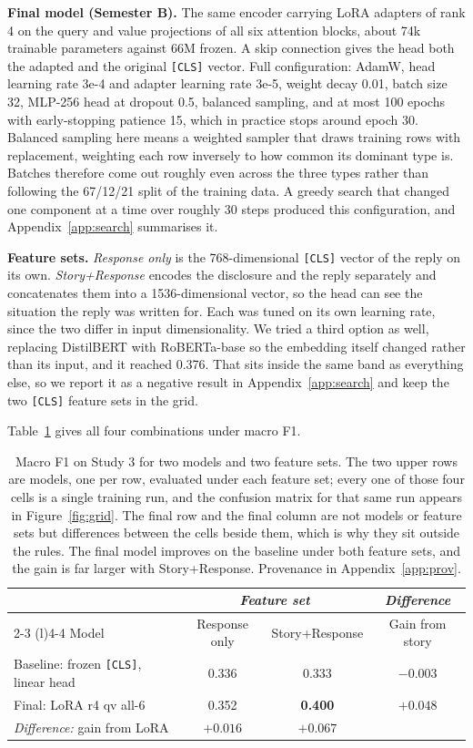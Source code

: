 \documentclass[11pt,a4paper]{article}
\begin{document}
\textbf{Final model (Semester B).} The same encoder carrying LoRA adapters of rank 4 on the
query and value projections of all six attention blocks, about 74k trainable parameters
against 66M frozen. A skip connection gives the head both the adapted and the original
\texttt{[CLS]} vector. Full configuration: AdamW, head learning rate 3e-4 and adapter
learning rate 3e-5, weight decay 0.01, batch size 32, MLP-256 head at dropout 0.5, balanced
sampling, and at most 100 epochs with early-stopping patience 15, which in practice stops
around epoch 30. Balanced sampling here means a weighted sampler that draws training rows
with replacement, weighting each row inversely to how common its dominant type is. Batches
therefore come out roughly even across the three types rather than following the 67/12/21
split of the training data. A greedy search that changed one component at a time over roughly 30
steps produced this configuration, and Appendix~\ref{app:search} summarises it.

\textbf{Feature sets.} \emph{Response only} is the 768-di\-men\-sion\-al \texttt{[CLS]}
vector of the reply on its own. \emph{Story+Response} encodes the disclosure and the reply
separately and concatenates them into a 1536-dimensional vector, so the head can see the
situation the reply was written for. Each was tuned on its own learning rate, since the two
differ in input dimensionality. We tried a third option as well, replacing DistilBERT with
RoBERTa-base so the embedding itself changed rather than its input, and it reached
0.376. That sits inside the same band as everything else, so we
report it as a negative result in Appendix~\ref{app:search} and keep the two
\texttt{[CLS]} feature sets in the grid.

Table~\ref{tab:grid} gives all four combinations under macro F1.

\begin{table}[h]
\centering
\footnotesize
\caption{Macro F1 on Study 3 for two models and two feature sets. The two upper rows are
models, one per row, evaluated under each feature set; every one of those four cells is a
single training run, and the confusion matrix for that same run appears in
Figure~\ref{fig:grid}. The final row and the final column are not models or feature sets but
differences between the cells beside them, which is why they sit outside the rules. The
final model improves on the baseline under both feature sets, and the gain is far larger
with Story+Response. Provenance in Appendix~\ref{app:prov}.}
\label{tab:grid}
\begin{tabular}{@{}lcc@{\qquad}c@{}}
\toprule
& \multicolumn{2}{c}{\textit{Feature set}} & \textit{Difference} \\
\cmidrule(lr){2-3} \cmidrule(l){4-4}
Model & Response only & Story+Response & Gain from story \\
\midrule
Baseline: frozen \texttt{[CLS]}, linear head & 0.336 & 0.333 & $-0.003$ \\
Final: LoRA r4 qv all-6 & 0.352 & \textbf{0.400} & $+0.048$ \\
\midrule
\textit{Difference:} gain from LoRA & $+0.016$ & $+0.067$ & \\
\bottomrule
\end{tabular}
\end{table}
\end{document}
